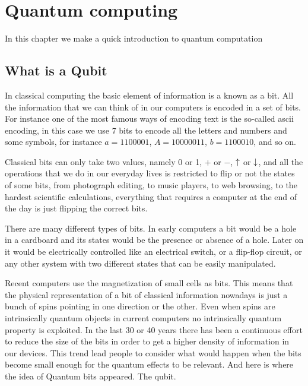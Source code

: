 \chapter{Quantum computing}
In this chapter we make a quick introduction to quantum computation 
\section{What is a Qubit}
In classical computing the basic element of information is a known as a bit. All the information that we can think of in our computers is encoded in a set of bits.
For instance one of the most famous ways of encoding text is the so-called \ac{ascii} encoding, in this case we use 7 bits to encode all the letters and numbers and some symbols, for instance $a=1100001$, $A=10000011$, $b=1100010$, and so on.

Classical bits can only take two values, namely 0 or 1, $+$ or $-$, $\uparrow$ or $\downarrow$, and all the operations that we do in our everyday lives is restricted to flip or not the states of some bits, from photograph editing, to music players, to web browsing, to the hardest scientific calculations, everything that requires a computer at the end of the day is just flipping the correct bits.


There are many different types of bits. In early computers a bit would be a hole in a cardboard and its states would be the presence or absence of a hole. Later on it would be electrically controlled like an electrical switch, or a flip-flop circuit, or any other system with two different states that can be easily manipulated.

Recent computers use the magnetization of small cells as bits. This means that the physical representation of a bit of classical information nowadays is just a bunch of spins pointing in one direction or the other.
Even when spins are intrinsically quantum objects in current computers no intrinsically quantum property is exploited.
In the last 30 or 40 years there has been a continuous effort to reduce the size of the bits in order to get a higher density of information in our devices. This trend lead people to consider what would happen when the bits become small enough for the quantum effects to be relevant. And here is where the idea of Quantum bits appeared.
The qubit.

